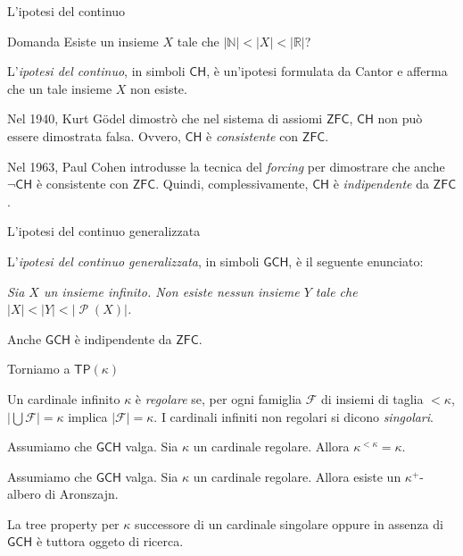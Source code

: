 \documentclass{beamer}
\theoremstyle{num.custom-title}
\theoremstyle{custom-title}
\DeclareMathOperator{\PP}{\mathcal{P}}
\newcommand{\ZFC}{\ensuremath{\mathsf{ZFC}}\xspace}
\newcommand{\TP}{\ensuremath{\mathsf{TP}}\xspace}
\newcommand{\GCH}{\ensuremath{\mathsf{GCH}}\xspace}
\newcommand{\CH}{\ensuremath{\mathsf{CH}}\xspace}
\newcommand{\F}{\mathcal{F}}
\newcommand{\N}{\mathbb{N}}
\newcommand{\R}{\mathbb{R}}
\begin{document}
\begin{frame}{L'ipotesi del continuo}

\begin{exampleblock}{Domanda}
Esiste un insieme $X$ tale che $|\N| < |X| < |\R|$?
\end{exampleblock}

\pause

L'\emph{ipotesi del continuo}, in simboli \CH, è un'ipotesi formulata da Cantor e afferma che un tale insieme $X$ non esiste.

\pause

Nel 1940, Kurt Gödel dimostrò che nel sistema di assiomi \ZFC, \CH non può essere dimostrata falsa. Ovvero, \CH è \emph{consistente} con \ZFC.

\pause

Nel 1963, Paul Cohen introdusse la tecnica del \emph{forcing} per dimostrare che anche $\neg\CH$ è consistente con \ZFC. Quindi, complessivamente, \CH è \emph{indipendente} da \ZFC.

\end{frame}


\begin{frame}{L'ipotesi del continuo generalizzata}

L'\emph{ipotesi del continuo generalizzata}, in simboli \GCH, è il seguente enunciato:
\begin{center}
\textit{Sia $X$ un insieme infinito. Non esiste nessun insieme $Y$ tale che $|X| < |Y| < |{\PP(X)}|$.}
\end{center}

\pause

Anche \GCH è indipendente da \ZFC.

\end{frame}


\begin{frame}{Torniamo a $\TP(\kappa)$}

\vspace{10pt}

\begin{definition}
Un cardinale infinito $\kappa$ è \emph{regolare} se, per ogni famiglia $\F$ di insiemi di taglia $<\kappa$, $|\bigcup \F| = \kappa$ implica $|\F| = \kappa$. I cardinali infiniti non regolari si dicono \emph{singolari}.
\end{definition}

\pause

\begin{lemma}
Assumiamo che \GCH valga. Sia $\kappa$ un cardinale regolare. Allora $\kappa^{<\kappa} = \kappa$.
\end{lemma}

\pause

\begin{corollary}
Assumiamo che \GCH valga. Sia $\kappa$ un cardinale regolare. Allora esiste un $\kappa^+$-albero di Aronszajn.
\end{corollary}
La tree property per $\kappa$ successore di un cardinale singolare oppure in assenza di \GCH è tuttora oggeto di ricerca.

\end{frame}
\end{document}
